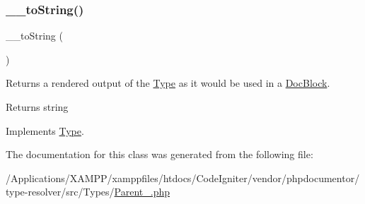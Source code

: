 \subsubsection{\texorpdfstring{\+\_\+\+\_\+to\+String()}{\_\_toString()}}
{\footnotesize\ttfamily \+\_\+\+\_\+to\+String (\begin{DoxyParamCaption}{ }\end{DoxyParamCaption})}

Returns a rendered output of the \mbox{\hyperlink{interfacephp_documentor_1_1_reflection_1_1_type}{Type}} as it would be used in a \mbox{\hyperlink{classphp_documentor_1_1_reflection_1_1_doc_block}{Doc\+Block}}.

\begin{DoxyReturn}{Returns}
string 
\end{DoxyReturn}


Implements \mbox{\hyperlink{interfacephp_documentor_1_1_reflection_1_1_type_a7516ca30af0db3cdbf9a7739b48ce91d}{Type}}.



The documentation for this class was generated from the following file\+:\begin{DoxyCompactItemize}
\item 
/\+Applications/\+X\+A\+M\+P\+P/xamppfiles/htdocs/\+Code\+Igniter/vendor/phpdocumentor/type-\/resolver/src/\+Types/\mbox{\hyperlink{_parent___8php}{Parent\+\_\+.\+php}}\end{DoxyCompactItemize}
